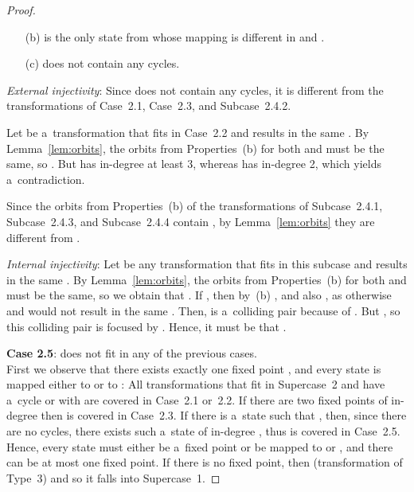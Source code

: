 \documentclass{amsart}
\begin{document}
\begin{proof}
\begin{enumerate}
\item[(b)]  is the only state from  whose mapping is different in  and .

\item[(c)]  does not contain any cycles.
\end{enumerate}

\textit{External injectivity}:
Since  does not contain any cycles, it is different from the transformations of Case~2.1, Case~2.3, and Subcase~2.4.2.

Let  be a~transformation that fits in Case~2.2 and results in the same .
By Lemma~\ref{lem:orbits}, the orbits from Properties~(b) for both  and  must be the same, so .
But  has in-degree at least 3, whereas  has in-degree 2, which yields a~contradiction.

Since the orbits from Properties~(b) of the transformations of Subcase~2.4.1, Subcase~2.4.3, and Subcase~2.4.4 contain , by Lemma~\ref{lem:orbits} they are different from .

\textit{Internal injectivity}:
Let  be any transformation that fits in this subcase and results in the same .
By Lemma~\ref{lem:orbits}, the orbits from Properties~(b) for both  and  must be the same, so we obtain that .
If , then by~(b) , and also , as otherwise  and  would not result in the same .
Then,  is a~colliding pair because of .
But , so this colliding pair is focused by .
Hence, it must be that .

\textbf{Case 2.5}:  does not fit in any of the previous cases.\\
First we observe that there exists exactly one fixed point , and every state  is mapped either to  or to :
All transformations that fit in Supercase~2 and have a~cycle or with  are covered in Case~2.1 or~2.2.
If there are two fixed points of in-degree  then  is covered in Case~2.3.
If there is a~state  such that , then, since there are no cycles, there exists such a~state of in-degree , thus  is covered in Case~2.5.
Hence, every state  must either be a~fixed point or be mapped to  or , and there can be at most one fixed point.
If there is no fixed point, then  (transformation of Type~3) and so it falls into Supercase~1.


\end{proof}
\end{document}
